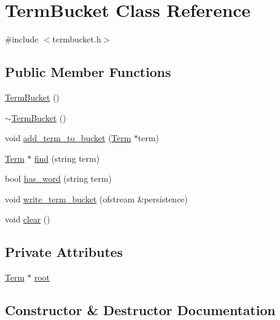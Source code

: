 \hypertarget{class_term_bucket}{}\section{Term\+Bucket Class Reference}
\label{class_term_bucket}


{\ttfamily \#include $<$termbucket.\+h$>$}

\subsection*{Public Member Functions}
\begin{DoxyCompactItemize}
\item 
\hyperlink{class_term_bucket_a2f45be1b657541ccf0d255b5a4a4b6e7}{Term\+Bucket} ()
\item 
\hyperlink{class_term_bucket_a2995af64e66038cce2604cd26f27b743}{$\sim$\+Term\+Bucket} ()
\item 
void \hyperlink{class_term_bucket_ad8bccbf5570ca903ec3b5b7e6d90da83}{add\+\_\+term\+\_\+to\+\_\+bucket} (\hyperlink{class_term}{Term} $\ast$term)
\item 
\hyperlink{class_term}{Term} $\ast$ \hyperlink{class_term_bucket_a637756154b34dce701969c0e930a0de5}{find} (string term)
\item 
bool \hyperlink{class_term_bucket_aa5f0d336448063bea5d33a090ac09785}{has\+\_\+word} (string term)
\item 
void \hyperlink{class_term_bucket_a9f861191a65c27611a4b15773b379716}{write\+\_\+term\+\_\+bucket} (ofstream \&persistence)
\item 
void \hyperlink{class_term_bucket_a8aa95625bf111166efd958f34e0da1e2}{clear} ()
\end{DoxyCompactItemize}
\subsection*{Private Attributes}
\begin{DoxyCompactItemize}
\item 
\hyperlink{class_term}{Term} $\ast$ \hyperlink{class_term_bucket_afffcce881e1d712ca56bc535d9c9dc0f}{root}
\end{DoxyCompactItemize}


\subsection{Constructor \& Destructor Documentation}
\hypertarget{class_term_bucket_a2f45be1b657541ccf0d255b5a4a4b6e7}{}
